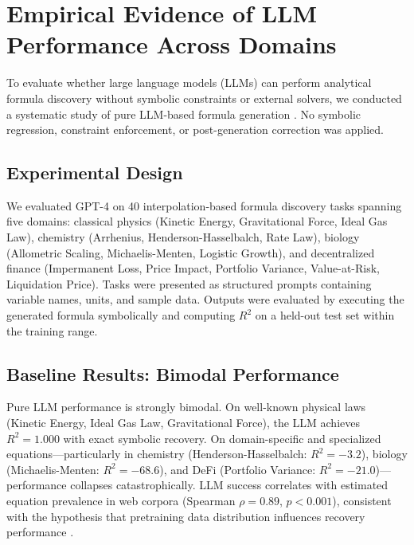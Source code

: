 \documentclass[twoside,11pt]{article}
\newcommand{\Rsq}{R^{2}}
\begin{document}
\section{Empirical Evidence of LLM Performance Across Domains}
\label{sec:llm_limitations}

To evaluate whether large language models (LLMs) can perform analytical formula discovery without symbolic constraints or external solvers, we conducted a systematic study of pure LLM-based formula generation \citep{koza1992genetic,kambhampati2024llms}. No symbolic regression, constraint enforcement, or post-generation correction was applied.

\subsection{Experimental Design}\label{subsec:experimental-design}
\label{sec:llm_exp_design}

We evaluated GPT-4 \citep{openai2023gpt4} on 40 interpolation-based formula discovery tasks spanning five domains: classical physics (Kinetic Energy, Gravitational Force, Ideal Gas Law), chemistry (Arrhenius, Henderson-Hasselbalch, Rate Law), biology (Allometric Scaling, Michaelis-Menten, Logistic Growth), and decentralized finance (Impermanent Loss, Price Impact, Portfolio Variance, Value-at-Risk, Liquidation Price). Tasks were presented as structured prompts containing variable names, units, and sample data. Outputs were evaluated by executing the generated formula symbolically and computing $\Rsq$ on a held-out test set within the training range.

\subsection{Baseline Results: Bimodal Performance}\label{subsec:baseline-results-bimodal-performance}
\label{sec:llm_baseline}

Pure LLM performance is strongly bimodal. On well-known physical laws (Kinetic Energy, Ideal Gas Law, Gravitational Force), the LLM achieves $\Rsq = 1.000$ with exact symbolic recovery. On domain-specific and specialized equations---particularly in chemistry (Henderson-Hasselbalch: $\Rsq = -3.2$), biology (Michaelis-Menten: $\Rsq = -68.6$), and DeFi (Portfolio Variance: $\Rsq = -21.0$)---performance collapses catastrophically. LLM success correlates with estimated equation prevalence in web corpora (Spearman $\rho = 0.89$, $p < 0.001$), consistent with the hypothesis that pretraining data distribution influences recovery performance \citep{kambhampati2024llms}.
\end{document}
